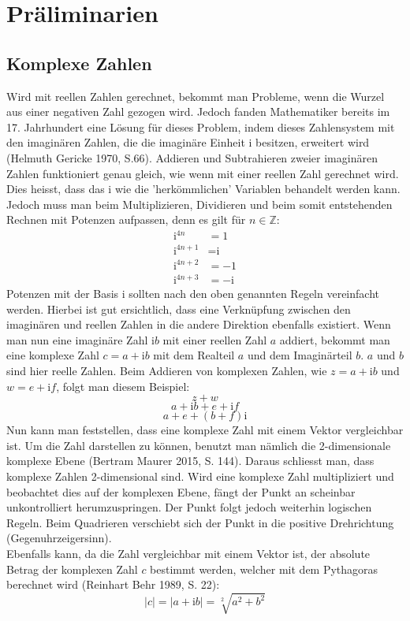 \section{Präliminarien}
\subsection{Komplexe Zahlen}
Wird mit reellen Zahlen gerechnet, bekommt man Probleme, wenn die Wurzel aus einer negativen Zahl gezogen wird. Jedoch fanden Mathematiker bereits im 17. Jahrhundert eine Lösung für dieses Problem, indem dieses Zahlensystem mit den imaginären Zahlen, die die imaginäre Einheit i besitzen, erweitert wird (Helmuth Gericke 1970, S.66). Addieren und Subtrahieren zweier imaginären Zahlen funktioniert genau gleich, wie wenn mit einer reellen Zahl gerechnet wird. Dies heisst, dass das i wie die 'herkömmlichen' Variablen behandelt werden kann. Jedoch muss man beim Multiplizieren, Dividieren und beim somit entstehenden Rechnen mit Potenzen aufpassen, denn es gilt für $n \in \mathbb{Z}$:
\begin{align*}
\text{i}^{4n} &= 1 \\
\text{i}^{4n+1} &= \text{i} \\
\text{i}^{4n+2} &= -1 \\
\text{i}^{4n+3} &= -\text{i}
\end{align*}
Potenzen mit der Basis i sollten nach den oben genannten Regeln vereinfacht werden. Hierbei ist gut ersichtlich, dass eine Verknüpfung zwischen den imaginären und reellen Zahlen in die andere Direktion ebenfalls existiert. Wenn man nun eine imaginäre Zahl $\text{i}b$ mit einer reellen Zahl $a$ addiert, bekommt man eine komplexe Zahl  $c=a+\text{i}b$ mit dem Realteil $a$ und dem Imaginärteil $b$. $a$ und $b$ sind hier reelle Zahlen. Beim Addieren von komplexen Zahlen, wie $z=a+\text{i}b$ und $w=e+\text{i}f$, folgt man diesem Beispiel:
\[z+w\]
\[a+\text{i}b+e+\text{i}f\]
\[a+e+(b+f)\text{i}\]
Nun kann man feststellen, dass eine komplexe Zahl mit einem Vektor vergleichbar ist. Um die Zahl darstellen zu können, benutzt man nämlich die 2-dimensionale komplexe Ebene (Bertram Maurer 2015, S. 144). Daraus schliesst man, dass komplexe Zahlen 2-dimensional sind. Wird eine komplexe Zahl multipliziert und beobachtet dies auf der komplexen Ebene, fängt der Punkt an scheinbar unkontrolliert herumzuspringen. Der Punkt folgt jedoch weiterhin logischen Regeln. Beim Quadrieren verschiebt sich der Punkt in die positive Drehrichtung (Gegenuhrzeigersinn).
\\
Ebenfalls kann, da die Zahl vergleichbar mit einem Vektor ist, der absolute Betrag der komplexen Zahl $c$ bestimmt werden, welcher mit dem Pythagoras berechnet wird (Reinhart Behr 1989, S. 22):
\[|c| = |a+\text{i}b| = \sqrt[2]{a^2+b^2}\]

